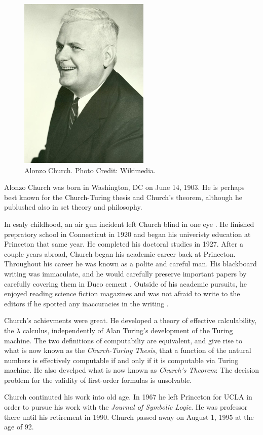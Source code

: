 \documentclass[../../../inclu
de/open-logic-section]{subfiles}
\begin{document}

\begin{figure}[h!]
 \centering
 \includegraphics[scale=0.8]{alonzo-church.jpg}
\caption{Alonzo Church. Photo Credit: Wikimedia.} 
\end{figure} 
Alonzo Church was born in Washington, DC on June 14, 1903. He is perhaps
 best known for the Church-Turing thesis and Church's theorem, although he
 publushed also in set theory and philosophy.
 
 In esaly childhood, an air gun incident left Church blind in one eye 
 \citep[2]{Enderton2016}. He finished prepratory school in Connecticut in 1920 
 and began his univeristy education at Princeton that same year. He completed his
 doctoral studies in 1927. After a couple years abroad, Church began his
academic career back at Princeton. Throughout his career he was known as
a polite and careful man. His blackboard writing was immaculate, and he would
carefully preserve important papers by carefully covering them in Duco cement
\citep[4]{Enderton2016}. Outside of his academic pursuits, he enjoyed reading
science fiction magazines and was not afraid to write to the editors if he
spotted any inaccuracies in the writing \citep[5]{Enderton2016}.

Church's achievments were great. He developed a theory of
effective calculability, the $\lambda$ calculus, independently of Alan
Turing's development of the Turing machine. The two definitions of
computabiliy are equivalent, and give rise to what is now known as the
\emph{Church-Turing Thesis}, that a function of the natural numbers is
effectively computable if and only if it is computable via Turing machine.
He also develped what is now known as \emph{Church's Theorem}: The 
decision problem for the validity of first-order formulas is unsolvable.

Church continuted his work into old age. In 1967 he left Princeton for UCLA
 in order to pursue his work with the \emph{Journal of Symbolic
Logic}. He was professor there until his retirement in 1990. Church passed
away on August 1, 1995 at the age of 92.
\end{document}
